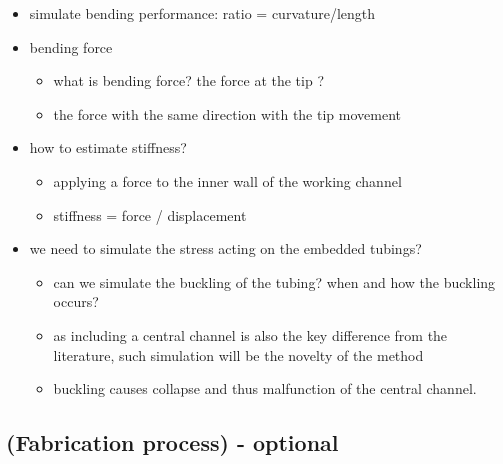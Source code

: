\documentclass[journal,onecolumn]{IEEEtran}
\begin{document}
\begin{itemize}
\item simulate bending performance: ratio = curvature/length
\item bending force 
\begin{itemize}
\item what is bending force? the force at the tip ?
\item the force with the same direction with the tip movement
\end{itemize}
\end{itemize}


\begin{itemize}
\item how to estimate stiffness?
\begin{itemize}
\item applying a force to the inner wall of the working channel
\item stiffness = force / displacement
\end{itemize}
\end{itemize}


\begin{itemize}
\item we need to simulate the stress acting on the embedded tubings?
\begin{itemize}
\item can we simulate the buckling of the tubing? when and how the buckling occurs?
\item as including a central channel is also the key difference from the literature, such simulation will be the novelty of the method
\item buckling causes collapse and thus malfunction of the central channel.
\end{itemize}
\end{itemize}


\subsection{(Fabrication process) - optional}
\label{sec:org2992447}
\end{document}
